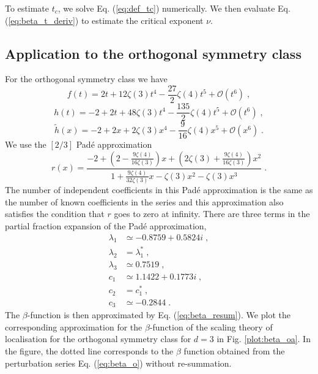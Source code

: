 \documentclass[singlecolumn]{jpsj3}
\begin{document}
To estimate $t_c$, we solve Eq. (\ref{eq:def_tc}) numerically. We then evaluate Eq. (\ref{eq:beta_t_deriv}) to estimate the critical exponent $\nu$.

\subsection{Application to the orthogonal symmetry class}
For the orthogonal symmetry class we have
\begin{equation}
  f(t) = 2t + 12\zeta(3)t^4 - \frac{27}{2} \zeta(4)t^5 + \mathcal{O}(t^6) \;,
\end{equation}
\begin{equation}
  h(t) = -2 + 2t + 48\zeta(3)t^4 - \frac{135}{2} \zeta(4)t^5 + \mathcal{O}(t^6) \;,
\end{equation}
\begin{equation}
  \tilde{h}(x) = -2+2x+2\zeta(3)x^4-\frac{9}{16}\zeta(4)x^5 +\mathcal{O}(x^6) \;.
\end{equation}
We use the $[2/3]$ Pad\'e approximation
\begin{equation}
  r(x) = \frac{-2+\left(2-\frac{9\zeta(4)}{16\zeta(3)}\right)x+\left(2\zeta(3)+\frac{9\zeta(4)}
  {16\zeta(3)}\right)x^2}{1+\frac{9\zeta(4)}{32\zeta(3)}x-\zeta(3)x^2-\zeta(3)x^3} \;.
\end{equation}
The number of independent coefficients in this Pad\'e approximation is the same as the number of known coefficients in the series and this approximation also satisfies the condition that $r$ goes to zero at infinity.
There are three terms in the partial fraction expansion of the Pad\'e approximation,
\begin{align}
	\lambda_1 &\simeq -0.8759+0.5824i \;, \nonumber \\
	\lambda_2 &= \lambda_1^{*}\;, \nonumber \\
	\lambda_3 &\simeq 0.7519\;, \nonumber \\
	c_1 &\simeq 1.1422 + 0.1773i\;, \nonumber \\
	c_2 &= c_1^{*}\;, \nonumber \\
	c_3 &\simeq -0.2844 \;.
\end{align}
The $\beta$-function is then approximated by Eq. (\ref{eq:beta_resum}).
We plot the corresponding approximation for the $\beta$-function of the scaling theory of localisation
for the orthogonal symmetry class for $d=3$ in Fig. \ref{plot:beta_oa}.
In the figure, the dotted line corresponds to the $\beta$ function obtained from the perturbation series
Eq. (\ref{eq:beta_o}) without re-summation.
\end{document}
